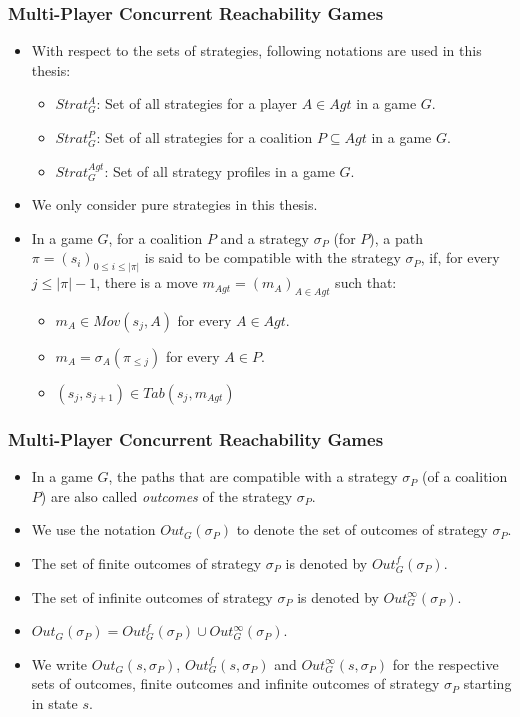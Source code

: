 \documentclass{beamer}
\begin{document}
\begin{frame}
\frametitle{Multi-Player Concurrent Reachability Games}
\begin{itemize}
\item With respect to the sets of strategies, following notations are used in this thesis:
\begin{itemize}
\item $Strat^{A}_{G}$: Set of all strategies for a player $A \in Agt$ in a game $G$.
\item $Strat^{P}_{G}$: Set of all strategies for a coalition $P \subseteq Agt$ in a game $G$.
\item $Strat^{Agt}_{G}$: Set of all strategy profiles in a game $G$.
\end{itemize}
\item We only consider pure strategies in this thesis.
\item In a game $G$, for a coalition $P$ and a strategy $\sigma_{P}$ (for $P$), a path $\pi = (s_{i})_{0\leq i\leq \vert \pi \vert}$ is said to be compatible with the strategy $\sigma_{P}$, if, for every $j \leq \vert \pi \vert - 1$, there is a move $m_{Agt} = (m_{A})_{A\in Agt}$ such that:
\begin{itemize}
\item $m_{A} \in Mov(s_{j}, A)$ for every $A \in Agt$.
\item $m_{A} = \sigma_{A}(\pi_{\leq j})$ for every $A \in P$.
\item $(s_{j}, s_{j+1}) \in Tab(s_{j}, m_{Agt})$ 
\end{itemize}
\end{itemize}
\end{frame}

\begin{frame}
\frametitle{Multi-Player Concurrent Reachability Games}
\begin{itemize}
\item In a game $G$, the paths that are compatible with a strategy $\sigma_{P}$ (of a coalition $P$) are also called \textit{outcomes} of the strategy $\sigma_{P}$.
\item We use the notation $Out_{G}(\sigma_{P})$ to denote the set of outcomes of strategy $\sigma_{P}$.
\item The set of finite outcomes of strategy $\sigma_{P}$ is denoted by $Out_{G}^{f}(\sigma_{P})$.
\item The set of infinite outcomes of strategy $\sigma_{P}$ is denoted by $Out_{G}^{\infty}(\sigma_{P})$.
\item $Out_{G}(\sigma_{P}) = Out_{G}^{f}(\sigma_{P}) \cup Out_{G}^{\infty}(\sigma_{P})$.
\item We write $Out_{G}(s, \sigma_{P})$, $Out_{G}^{f}(s, \sigma_{P})$ and $Out_{G}^{\infty}(s, \sigma_{P})$ for the respective sets of outcomes, finite outcomes and infinite outcomes of strategy $\sigma_{P}$ starting in state $s$.
\end{itemize}
\end{frame}
\end{document}
